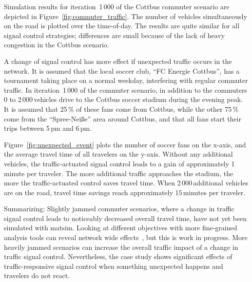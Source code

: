 Simulation results for iteration~1\,000 of the Cottbus commuter scenario are depicted in Figure~\ref{fig:commuter_traffic}. The number of vehicles simultaneously on the road is plotted over the time-of-day. The results are quite similar for all signal control strategies; differences are small because of the lack of heavy congestion in the Cottbus scenario. 

A change of signal control has more effect if unexpected traffic occurs in the network. It is assumed that the local soccer club, ``FC Energie Cottbus'', has a tournament taking place on a normal weekday, interfering with regular commuter traffic. In iteration~1\,000 of the commuter scenario, in addition to the commuters 0 to 2\,000\,vehicles drive to the Cottbus soccer stadium during the evening peak. It is assumed that 25\,\% of these fans come from Cottbus, while the other 75\,\% come from the ``Spree-Nei{\ss}e'' area around Cottbus, and that all fans start their trips between 5\,pm and 6\,pm. 

Figure~\ref{fig:unexpected_event} plots the number of soccer fans on the x-axis, and the average travel time of all travelers on the y-axis. Without any additional vehicles, the traffic-actuated signal control leads to a gain of approximately 1\,minute per traveler. The more additional traffic approaches the stadium, the more the traffic-actuated control saves travel time. When 2\,000\,additional vehicles are on the road, travel time savings reach approximately 15\,minutes per traveler. 

Summarizing: Slightly jammed commuter scenarios, where a change in traffic signal control leads to noticeably decreased overall travel time, have not yet been simulated with \gls{matsim}. Looking at different objectives with more fine-grained analysis tools can reveal network wide effects~\citep[\eg see the analysis using macroscopic fundamental diagrams][pp.114]{Grether2014PhD}, but this is work in progress. More heavily jammed scenarios can increase the overall traffic impact of a change in traffic signal control. Nevertheless, the case study shows significant effects of traffic-responsive signal control when something unexpected happens and travelers do not react.  

